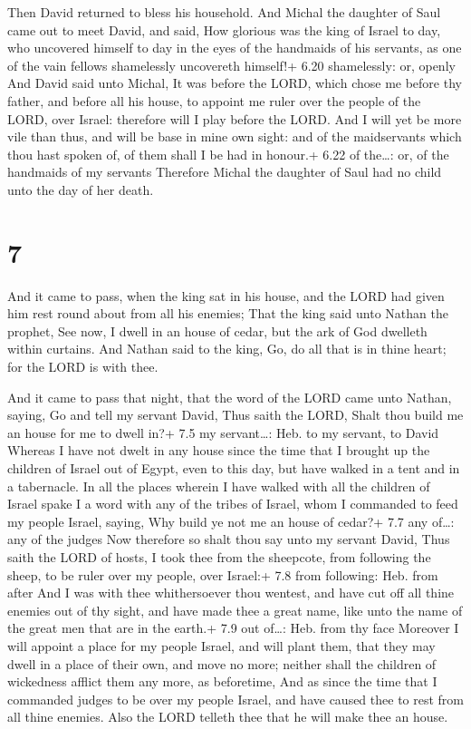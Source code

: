  Then David returned to bless his household. And Michal
the daughter of Saul came out to meet David, and said, How glorious was
the king of Israel to day, who uncovered himself to day in the eyes of
the handmaids of his servants, as one of the vain fellows shamelessly
uncovereth himself!+ 6.20 shamelessly: or, openly  And
David said unto Michal, It was before the LORD, which chose me before
thy father, and before all his house, to appoint me ruler over the
people of the LORD, over Israel: therefore will I play before the LORD.
 And I will yet be more vile than thus, and will be base in
mine own sight: and of the maidservants which thou hast spoken of, of
them shall I be had in honour.+ 6.22 of the\ldots: or, of the handmaids
of my servants  Therefore Michal the daughter of Saul had
no child unto the day of her death.

\hypertarget{section-6}{%
\section{7}\label{section-6}}

 And it came to pass, when the king sat in his house, and
the LORD had given him rest round about from all his enemies;
 That the king said unto Nathan the prophet, See now, I
dwell in an house of cedar, but the ark of God dwelleth within curtains.
 And Nathan said to the king, Go, do all that is in thine
heart; for the LORD is with thee.

 And it came to pass that night, that the word of the LORD
came unto Nathan, saying,  Go and tell my servant David,
Thus saith the LORD, Shalt thou build me an house for me to dwell in?+
7.5 my servant\ldots: Heb. to my servant, to David  Whereas
I have not dwelt in any house since the time that I brought up the
children of Israel out of Egypt, even to this day, but have walked in a
tent and in a tabernacle.  In all the places wherein I have
walked with all the children of Israel spake I a word with any of the
tribes of Israel, whom I commanded to feed my people Israel, saying, Why
build ye not me an house of cedar?+ 7.7 any of\ldots: any of the judges
 Now therefore so shalt thou say unto my servant David, Thus
saith the LORD of hosts, I took thee from the sheepcote, from following
the sheep, to be ruler over my people, over Israel:+ 7.8 from following:
Heb. from after  And I was with thee whithersoever thou
wentest, and have cut off all thine enemies out of thy sight, and have
made thee a great name, like unto the name of the great men that are in
the earth.+ 7.9 out of\ldots: Heb. from thy face  Moreover
I will appoint a place for my people Israel, and will plant them, that
they may dwell in a place of their own, and move no more; neither shall
the children of wickedness afflict them any more, as beforetime,
 And as since the time that I commanded judges to be over
my people Israel, and have caused thee to rest from all thine enemies.
Also the LORD telleth thee that he will make thee an house.

